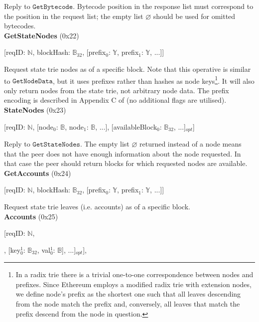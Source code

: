 \documentclass{amsart}
\begin{document}
Reply to $\texttt{GetBytecode}$.
Bytecode position in the response list must correspond to the position in the request list;
the empty list $\varnothing$ should be used for omitted bytecodes.\\

\textbf{GetStateNodes} (0x22)

[reqID: $\mathbb{N}$, blockHash: $\mathbb{B}_{32}$,
[prefix$_0$: $\mathbb{Y}$, prefix$_1$: $\mathbb{Y}$, ...]]
\medskip

Request state trie nodes as of a specific block.
Note that this operative is similar to $\texttt{GetNodeData}$,
but it uses prefixes rather than hashes as node keys\footnote{In
a radix trie there is a trivial one-to-one correspondence between nodes and prefixes.
Since Ethereum employs a modified radix trie with extension nodes,
we define node's prefix as the shortest one such that
all leaves descending from the node match the prefix
and, conversely, all leaves that match the prefix descend from the node in question.}.
It will also only return nodes from the state trie,
not arbitrary node data.
The prefix encoding is described in Appendix C of \cite{yellow_paper}
(no additional flags are utilised).\\

\textbf{StateNodes} (0x23)

[reqID: $\mathbb{N}$,
[node$_0$: $\mathbb{B}$, node$_1$: $\mathbb{B}$, ...],
[availableBlock$_0$: $\mathbb{B}_{32}$, ...]$_{opt}$]
\medskip

Reply to $\texttt{GetStateNodes}$.
The empty list $\varnothing$ returned instead of a node means that the peer does not have enough information about the node requested.
In that case the peer should return blocks for which requested nodes are available.\\

\textbf{GetAccounts} (0x24)

[reqID: $\mathbb{N}$, blockHash: $\mathbb{B}_{32}$, [prefix$_0$: $\mathbb{Y}$, prefix$_1$: $\mathbb{Y}$, ...]]
\medskip

Request state trie leaves (i.e. accounts) as of a specific block.\\

\textbf{Accounts} (0x25)

[reqID: $\mathbb{N}$,

\quad [

\qquad [status$_0$: $\mathbb{N}$, [[key$^0_{0}$: $\mathbb{B}_{32}$, val$^0_{0}$: $\mathbb{B}$], [key$^1_{0}$: $\mathbb{B}_{32}$, val$^1_{0}$: $\mathbb{B}$], ...]$_{opt}$],
\end{document}
